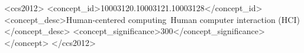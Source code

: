 \documentclass[sigconf]{acmart}
\let\xtodo\todo
\renewcommand{\todo}[1]{\xtodo[inline,color=green!50]{#1}}
\begin{document}
\begin{CCSXML}
<ccs2012>
    <concept_id>10003120.10003121.10003128</concept_id>
        <concept_desc>Human-centered computing~Human computer interaction (HCI)</concept_desc>
        <concept_significance>300</concept_significance>
    </concept>
 </ccs2012>
\end{CCSXML}



\maketitle















\end{document}
